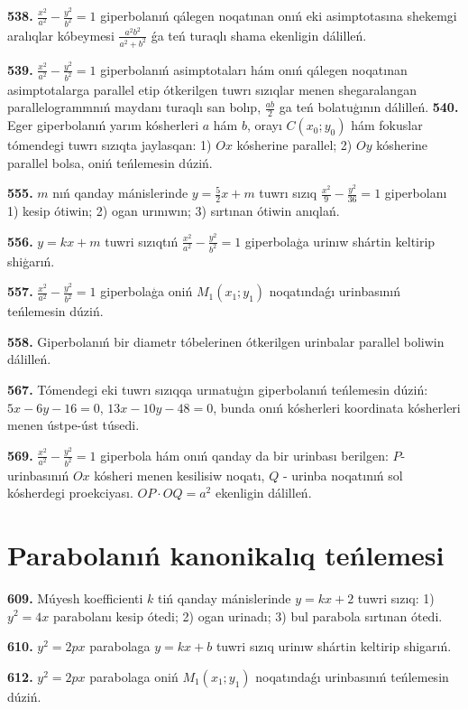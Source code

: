\textbf{538.} $\frac{x^2}{a^2}-\frac{y^2}{b^2}=1$ giperbolanıń qálegen noqatınan onıń eki asimptotasına shekemgi aralıqlar kóbeymesi $\frac{a^2 b^2}{a^2+b^2}$ ǵa teń turaqlı shama ekenligin dálilleń.

\textbf{539.} $\frac{x^2}{a^2}-\frac{y^2}{b^2}=1$ giperbolanıń asimptotaları hám onıń qálegen noqatınan asimptotalarga parallel etip ótkerilgen tuwrı sızıqlar menen shegaralangan parallelogrammnıń maydanı turaqlı san bolıp, $\frac{a b}{2}$ ga teń bolatuģının dálilleń.
\textbf{540.} Eger giperbolanıń yarım kósherleri $a$ hám $b$, orayı $C\left (x_0; y_0\right) $ hám fokuslar tómendegi tuwrı sızıqta jaylasqan: 1) $O x$ kósherine parallel; 2) $O y$ kósherine parallel bolsa, oniń teńlemesin dúziń.

\textbf{555.} $m$ nıń qanday mánislerinde $y=\frac{5}{2} x+m$ tuwrı sızıq $\frac{x^2}{9}-\frac{y^2}{36}=1$ giperbolanı 1) kesip ótiwin; 2) ogan urınıwın; 3) sırtınan ótiwin anıqlań.

\textbf{556.} $y=k x+m$ tuwri sızıqtıń $\frac{x^2}{a^2}-\frac{y^2}{b^2}=1$ giperbolaģa urinıw shártin keltirip shiģarıń.

\textbf{557.} $\frac{x^2}{a^2}-\frac{y^2}{b^2}=1$ giperbolaģa oniń $M_1\left (x_1; y_1\right) $ noqatındaǵı urinbasınıń teńlemesin dúziń.

\textbf{558.} Giperbolanıń bir diametr tóbelerinen ótkerilgen urinbalar parallel boliwin dálilleń.

\textbf {567.} Tómendegi eki tuwrı sızıqqa urınatuģın giperbolanıń teńlemesin dúziń:$5x-6y-16=0$, $13x-10y-48=0$, bunda onıń kósherleri koordinata kósherleri menen ústpe-úst túsedi.

\textbf{569.} $\frac{x^2}{a^2}-\frac{y^2}{b^2}=1$ giperbola hám onıń qanday da bir urinbası berilgen: $P$-urinbasınıń $O x$ kósheri menen kesilisiw noqatı, $Q$ - urinba noqatınıń sol kósherdegi proekciyası. $O P \cdot O Q=a^2$ ekenligin dálilleń.

\section{ Parabolanıń kanonikalıq teńlemesi}


\textbf{609.} Múyesh koefficienti $k$ tiń qanday mánislerinde $y=kx+2$ tuwri sızıq: 1) $y^2=4x$ parabolanı kesip ótedi; 2) ogan urinadı; 3) bul parabola sırtınan ótedi.

\textbf {610.} $y^2=2 p x$ parabolaga $y=k x+b$ tuwri sızıq urinıw shártin keltirip shigarıń.

\textbf {612.} $y^2=2 p x$ parabolaga oniń $M_1\left (x_1; y_1\right) $ noqatındaǵı urinbasınıń teńlemesin dúziń.


